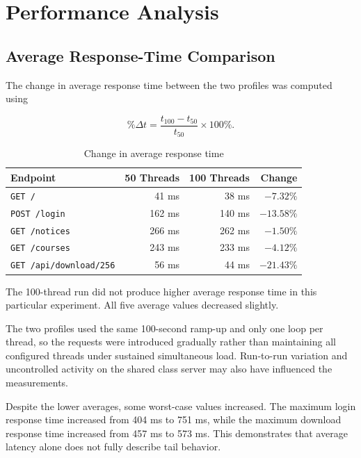 \documentclass[11pt,a4paper]{article}
\begin{document}
\section{Performance Analysis}

\subsection{Average Response-Time Comparison}

The change in average response time between the two profiles was computed using

\[
\%\Delta t =
\frac{t_{100}-t_{50}}{t_{50}}\times 100\%.
\]

\begin{table}[H]
\centering
\caption{Change in average response time}
\label{tab:responsechange}
\begin{tabular}{lrrr}
\toprule
\textbf{Endpoint} & \textbf{50 Threads} & \textbf{100 Threads} & \textbf{Change} \\
\midrule
\texttt{GET /} & 41 ms & 38 ms & $-7.32\%$ \\
\texttt{POST /login} & 162 ms & 140 ms & $-13.58\%$ \\
\texttt{GET /notices} & 266 ms & 262 ms & $-1.50\%$ \\
\texttt{GET /courses} & 243 ms & 233 ms & $-4.12\%$ \\
\texttt{GET /api/download/256} & 56 ms & 44 ms & $-21.43\%$ \\
\bottomrule
\end{tabular}
\end{table}

\noindent The 100-thread run did not produce higher average response time in this particular experiment. All five average values decreased slightly. \newline 

\noindent The two profiles used the same 100-second ramp-up and only one loop per thread, so the requests were introduced gradually rather than maintaining all configured threads under sustained simultaneous load. Run-to-run variation and uncontrolled activity on the shared class server may also have influenced the measurements. \newline 

\noindent Despite the lower averages, some worst-case values increased. The maximum login response time increased from 404 ms to 751 ms, while the maximum download response time increased from 457 ms to 573 ms. This demonstrates that average latency alone does not fully describe tail behavior.
\end{document}

